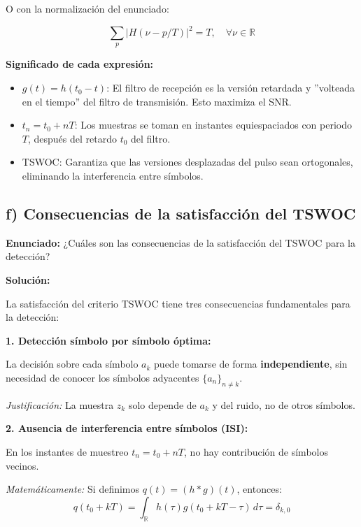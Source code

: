 \documentclass[11pt,a4paper]{article}
\begin{document}
O con la normalizaci\'on del enunciado:

\[
\boxed{\sum_p |H(\nu - p/T)|^2 = T, \quad \forall \nu \in \mathbb{R}}
\]

\textbf{Significado de cada expresi\'on:}

\begin{itemize}
    \item $g(t) = h(t_0 - t)$: El filtro de recepci\'on es la versi\'on retardada y ''volteada en el tiempo'' del filtro de transmisi\'on. Esto maximiza el SNR.
    
    \item $t_n = t_0 + nT$: Los muestras se toman en instantes equiespaciados con periodo $T$, despu\'es del retardo $t_0$ del filtro.
    
    \item TSWOC: Garantiza que las versiones desplazadas del pulso sean ortogonales, eliminando la interferencia entre s\'imbolos.
\end{itemize}



\subsection*{f) Consecuencias de la satisfacci\'on del TSWOC}

\textbf{Enunciado:} ¿Cu\'ales son las consecuencias de la satisfacci\'on del TSWOC para la detecci\'on?

\vspace{0.3cm}
\textbf{Soluci\'on:}

La satisfacci\'on del criterio TSWOC tiene tres consecuencias fundamentales para la detecci\'on:

\textbf{1. Detecci\'on s\'imbolo por s\'imbolo \'optima:}

La decisi\'on sobre cada s\'imbolo $a_k$ puede tomarse de forma \textbf{independiente}, sin necesidad de conocer los s\'imbolos adyacentes $\{a_n\}_{n \neq k}$.

\textit{Justificaci\'on:} La muestra $z_k$ solo depende de $a_k$ y del ruido, no de otros s\'imbolos.

\textbf{2. Ausencia de interferencia entre s\'imbolos (ISI):}

En los instantes de muestreo $t_n = t_0 + nT$, no hay contribuci\'on de s\'imbolos vecinos.

\textit{Matem\'aticamente:} Si definimos $q(t) = (h * g)(t)$, entonces:
\[
q(t_0 + kT) = \int_{\mathbb{R}} h(\tau) g(t_0 + kT - \tau)\, d\tau = \delta_{k,0}
\]
\end{document}
